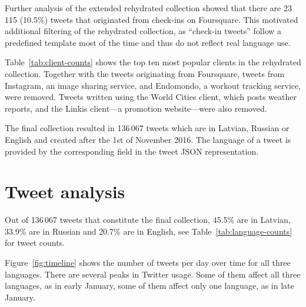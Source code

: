 \documentclass[11pt,a4paper]{article}
\begin{document}
% 

Further analysis of the extended rehydrated collection showed that there are 23\,115 (10.5\%) tweets that originated from check-ins on Foursquare. %
This motivated additional filtering of the rehydrated collection, as ``check-in tweets'' follow a predefined template most of the time and thus do not reflect real language use. %



Table~\ref{tab:client-counts} shows the top ten most popular clients in the rehydrated collection. Together with the tweets originating from Foursquare, tweets from Instagram, %
an image sharing service, and Endomondo, %
a workout tracking service, were removed. Tweets written using the World Cities client, which posts weather reports, and the Linkis client---a promotion website---were also removed.

The final collection resulted in 136\,067 tweets which are in Latvian, Russian or English and created after the 1st of November 2016. The language of a tweet is provided by the corresponding field in the tweet JSON representation.

\section{Tweet analysis}
\label{sec:timeline}



Out of 136\,067 tweets that constitute the final collection, 45.5\% are in Latvian, 33.9\% are in Russian and 20.7\% are in English, see Table~\ref{tab:language-counts} for tweet counts.



Figure~\ref{fig:timeline} shows the number of tweets per day over time for all three languages. There are several peaks in Twitter usage. Some of them affect all three languages, as in early January, some of them affect only one language, as in late January.
\end{document}
